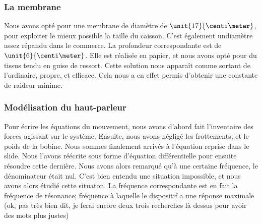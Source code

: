 \documentclass{article}
\begin{document}
\subsubsection{La membrane}
Nous avons opté pour une membrane de diamètre de $\unit{17}{\centi\meter}$, pour exploiter le mieux possible la taille du
caisson. C'est également undiamètre assez répandu dans le commerce. La profondeur correspondante est de $\unit{6}{\centi\meter}$.
Elle est réalisée en papier, et nous avons opté pour du tissus tendu en guise de ressort. Cette solution nous apparaît comme
sortant de l'ordinaire, propre, et efficace. Cela nous a en effet permis d'obtenir une constante de raideur minime.

\subsubsection{Modélisation du haut-parleur}
Pour écrire les équations du mouvement, nous avons d'abord fait l'inventaire des forces agissant sur le système. Ensuite, nous
avons négligé les frottements, et le poids de la bobine. Nous sommes finalement arrivés à l'équation reprise dans le slide. 
Nous l'avons réécrite sous forme d'équation différentielle pour ensuite résoudre cette dernière. Nous avons alors remarqué 
qu'à une certaine fréquence, le dénominateur était nul. C'est bien entendu une situation impossible, et nous avons alors
étudié cette situaton. La fréquence correspondante est en fait la fréquence de résonance; fréquence à laquelle le dispositif a
une réponse maximale (ok, pas très bien dit, je ferai encore deux trois recherches là dessus pour avoir des mots plus justes)
\end{document}
